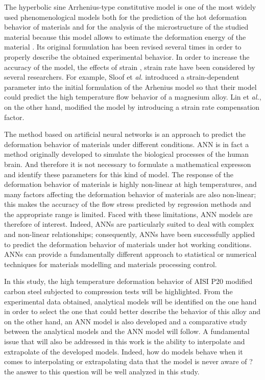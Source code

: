 \documentclass[twoside,english,1p,final,sort&compress]{elsarticle}
\makeatletter
\theoremstyle{plain}
\newcommand*{\eal}{et \emph{al.}\@\xspace}
\makeatother
\begin{document}
The hyperbolic sine Arrhenius-type constitutive model is one of the most widely used phenomenological models both for the prediction of the hot deformation behavior of materials and for the analysis of the microstructure of the studied material because   this model allows to estimate the deformation energy of the material \cite{jonas1969strength,zhang2012effect,mostafaei2012hot}. Its original formulation has been revised several times in order to properly describe the obtained experimental behavior. In order to increase the accuracy of the model, the effects of strain \cite{slooff2007constitutive, li2012flow, xu2013constitutive}, strain rate \cite{lin2008constitutive, mandal2009constitutive} have been considered by several researchers. For example, Sloof \eal \cite{slooff2007constitutive} introduced a strain-dependent parameter into the initial formulation of the Arhenius model so that their model could predict the high temperature flow behavior of a magnesium alloy. Lin \eal \cite{lin2008constitutive}, on the other hand, modified the model by introducing a strain rate compensation factor.

The method based on artiﬁcial neural networks is an approach to predict the deformation behavior of materials under different conditions. ANN is in fact a method originally developed to simulate the biological processes of the human brain. And therefore it is not necessary to formulate a mathematical expresson and identify these parameters for this kind of model. The response of the deformation behavior of materials is highly non-linear at high temperatures, and many factors affecting the deformation behavior of materials are also non-linear; this makes the accuracy of the flow stress predicted by regression methods and the appropriate range is limited. Faced with these limitations, ANN models are therefore of interest.  Indeed, ANNs are particularly suited to deal with complex and non-linear relationships; consequently, ANNs have been successfully applied to predict the deformation behavior of materials under hot working conditions. ANNs can provide a fundamentally different approach to statistical or numerical techniques for materials modelling and materials processing control.

In this study, the high temperature deformation behavior of AISI P20 modified carbon steel subjected to compression tests will be highlighted. From the experimental data obtained, analytical models will be identified on the one hand in order to select the one that could better describe the behavior of this alloy and on the other hand, an ANN model is also developed and a comparative study between the analytical models and the ANN model will follow. A fundamental issue that will also be addressed in this work is the ability to interpolate and extrapolate of the developed models. Indeed, how do models behave when it comes to interpolating or extrapolating data that the model is never aware of ? the answer to this question will be well analyzed in this study.
\end{document}
